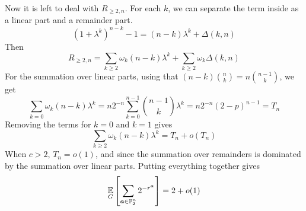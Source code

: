 \documentclass{article}
\theoremstyle{plain}
\theoremstyle{definition}
\theoremstyle{remark}
\begin{document}
Now it is left to deal with $R_{\ge2,n}$. For each $k$, we can separate the term inside as a linear part and a remainder part. \begin{equation}
(1+\lambda^k)^{n-k} - 1 = (n-k)\lambda^k + \Delta(k,n)
\end{equation}
Then \begin{equation}
    R_{\ge2,n} = \sum_{k\geq 2} \omega_k (n-k)\lambda^k + \sum_{k\geq 2} \omega_k\Delta(k,n)
\end{equation}
For the summation over linear parts, using that $(n-k)\binom{n}{k} = n \binom{n-1}{k}$, we get 
\begin{equation}
    \sum_{k=0} \omega_k (n-k)\lambda^k = n2^{-n} \sum_{k=0}^{n-1} \binom{n-1}{k} \lambda^k = n2^{-n}(2-p)^{n-1} = T_n
\end{equation}
Removing the terms for $k=0$ and $k=1$ gives
\begin{equation}
    \sum_{k\geq 2} \omega_k (n-k)\lambda^k = T_n + o(T_n)
\end{equation}
When $c>2$, $T_n = o(1)$, and since the summation over remainders is dominated by the summation over linear parts. Putting everything together gives
\begin{equation}
    \operatorname*{\mathbb{E}}_G\left[\sum_{{\bm{a}} \in \mathbb{F}_2^n}  2^{-r^{\bm{a}}}\right] = 2 + o(1)
\end{equation}
\end{document}
